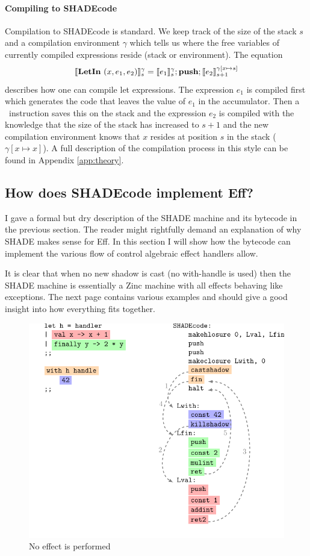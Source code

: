 \documentclass[class=article, crop=false]{standalone}
\begin{document}
\paragraph{Compiling to SHADEcode}

Compilation to SHADEcode is standard. We keep track of the size of the stack
$s$ and a compilation environment $\gamma$ which tells us where the free
variables of currently compiled expressions reside (stack or environment).
The equation
$$ \llbracket \mathbf{LetIn}\ (x, e_1, e_2) \rrbracket_s^\gamma = \llbracket e_1 \rrbracket_s^\gamma; \textbf{push}; \llbracket e_2 \rrbracket_{s+1}^{\gamma[x \mapsto s]} $$
describes how one can compile let expressions. The expression $e_1$ is compiled
first which generates the code that leaves the value of $e_1$ in the accumulator.
Then a \vmPush\ instruction saves this on the stack and the expression $e_2$ is
compiled with the knowledge that the size of the stack has increased to $s+1$
and the new compilation environment knows that $x$ resides at position $s$ in
the stack ($\gamma[x \mapsto x]$). A full description of the compilation process
in this style can be found in Appendix \autoref{app:theory}.

\subsection{How does SHADEcode implement Eff?}
\label{sec:shade-illustration}

I gave a formal but dry description of the SHADE machine and its bytecode in
the previous section. The reader might rightfully demand an explanation of why
SHADE makes sense for Eff. In this section I will show how the bytecode can
implement the various flow of control algebraic effect handlers allow.

It is clear that when no new shadow is cast (no with-handle is used) then the
SHADE machine is essentially a Zinc \cite{leroy1990zinc} machine with all
effects behaving like exceptions. The next page contains various examples and
should give a good insight into how everything fits together.

\begin{figure}[htb]
    \centering
    \includegraphics[width=.8\linewidth]{../figures/impl-no-perform.pdf}

    \caption{No effect is performed}
    \label{fig:shadecode-no-effect}
\end{figure}
\end{document}
